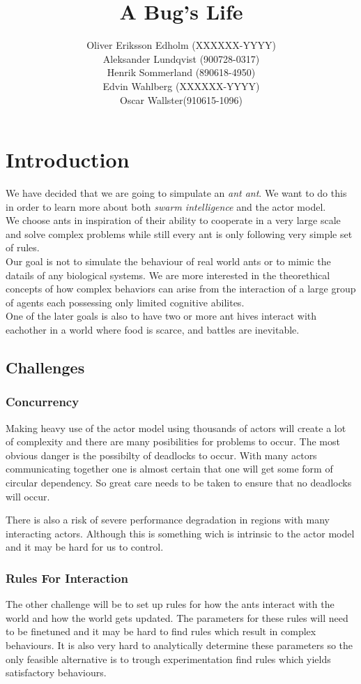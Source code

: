 \documentclass[a4paper]{article}
\title{A Bug's Life}
\author{Oliver Eriksson Edholm (XXXXXX-YYYY) \\
Aleksander Lundqvist (900728-0317) \\
Henrik Sommerland (890618-4950) \\
Edvin Wahlberg (XXXXXX-YYYY) \\
Oscar Wallster(910615-1096)}
\begin{document}
\maketitle

\section{Introduction}
We have decided that we are going to simpulate an \emph{ant ant}. We want to do
this in order to learn more about both \emph{swarm intelligence} and the actor
model.\\
We choose ants in inspiration of their ability to cooperate in a very large
scale and solve complex problems while still every ant is only following very
simple set of rules.
\\
Our goal is not to simulate the behaviour of real world ants or to mimic the
datails of any biological systems.
We are more interested in the theorethical concepts of how complex behaviors can
arise from the interaction of a large group of agents each possessing only limited
cognitive abilites.\\

One of the later goals is also to have two or more ant hives interact with
eachother in a world where food is scarce, and battles are inevitable.

\subsection{Challenges}

\subsubsection{Concurrency}
Making heavy use of the actor model using thousands of actors will create a lot
of complexity and there are many posibilities for problems to occur. The most
obvious danger is the possibilty of deadlocks to occur. With many actors
communicating together one is almost certain that one will get some form of
circular dependency. So great care needs to be taken to ensure that no
deadlocks will occur.

There is also a risk of severe performance degradation in regions with many
interacting actors. Although this is something wich is intrinsic to the actor
model and it may be hard for us to control.

\subsubsection{Rules For Interaction}
The other challenge will be to set up rules for how the ants interact with the
world and how the world gets updated. The parameters for these rules will need
to be finetuned and it may be hard to find rules which result in complex
behaviours. It is also very hard to analytically determine these parameters so
the only feasible alternative is to trough experimentation find rules which
yields satisfactory behaviours.
\end{document}
